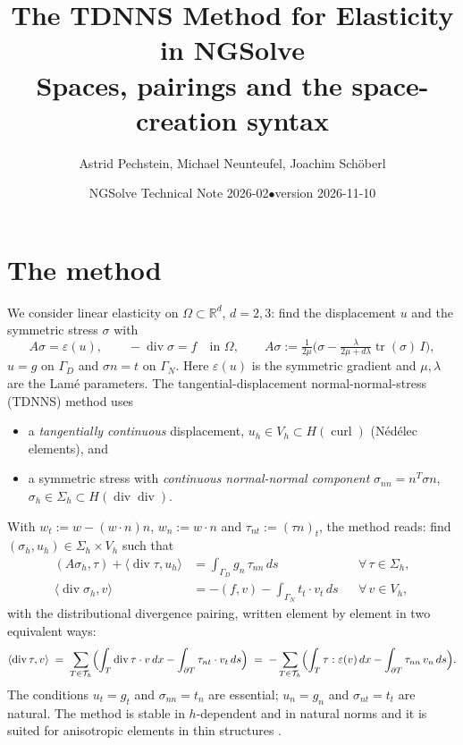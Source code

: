 \documentclass[10pt,a4paper]{article}
\title{\vspace{-1.2cm}The TDNNS Method for Elasticity in NGSolve\\[2pt]
\large Spaces, pairings and the space-creation syntax}
\author{Astrid Pechstein, Michael Neunteufel, Joachim Sch\"oberl}
\date{NGSolve Technical Note 2026-02\quad$\bullet$\quad version 2026-11-10}
\newcommand{\Th}{\mathcal{T}_h}
\newcommand{\Div}{\operatorname{div}}
\begin{document}
\maketitle\vspace{-1.2cm}

\section{The method}

We consider linear elasticity on $\Omega\subset\mathbb R^d$, $d=2,3$: find the displacement $u$ and the symmetric stress $\sigma$ with
\[
  A\sigma = \varepsilon(u), \qquad -\Div\sigma = f \quad\text{in }\Omega, \qquad
  A\sigma := \tfrac{1}{2\mu}\bigl(\sigma - \tfrac{\lambda}{2\mu+d\lambda}\operatorname{tr}(\sigma)\,I\bigr),
\]
$u=g$ on $\Gamma_D$ and $\sigma n = t$ on $\Gamma_N$. Here $\varepsilon(u)$ is the symmetric gradient and $\mu,\lambda$ are the Lam\'e parameters.
The tangential-displacement normal-normal-stress (TDNNS) method \cite{sinwel,ps11} uses
\begin{itemize}\setlength\itemsep{1pt}
\item a \emph{tangentially continuous} displacement, $u_h\in V_h\subset H(\operatorname{curl})$ (N\'ed\'elec elements), and
\item a symmetric stress with \emph{continuous normal-normal component} $\sigma_{nn}=n^T\sigma n$, $\sigma_h\in\Sigma_h\subset H(\Div\Div)$.
\end{itemize}
With $w_t := w-(w\cdot n)n$, $w_n:=w\cdot n$ and $\tau_{nt}:=(\tau n)_t$, the method reads: find $(\sigma_h,u_h)\in\Sigma_h\times V_h$ such that
\begin{align*}
  (A\sigma_h,\tau) + \langle\Div\tau,u_h\rangle &= \textstyle\int_{\Gamma_D} g_n\,\tau_{nn}\,ds && \forall\,\tau\in\Sigma_h,\\
  \langle\Div\sigma_h,v\rangle &= -(f,v) - \textstyle\int_{\Gamma_N} t_t\cdot v_t\,ds && \forall\,v\in V_h,
\end{align*}
with the distributional divergence pairing, written element by element in two equivalent ways:
\[
  \langle\Div\tau,v\rangle \;=\; \sum_{T\in\Th}\Bigl(\int_T \Div\tau\cdot v\,dx - \int_{\partial T}\tau_{nt}\cdot v_t\,ds\Bigr)
  \;=\; -\sum_{T\in\Th}\Bigl(\int_T \tau:\varepsilon(v)\,dx - \int_{\partial T}\tau_{nn}\,v_n\,ds\Bigr).
\]
The conditions $u_t=g_t$ and $\sigma_{nn}=t_n$ are essential; $u_n = g_n$ and $\sigma_{nt}=t_t$ are natural.
The method is stable in $h$-dependent and in natural norms \cite{ps11,ps18} and it is suited for anisotropic elements in thin structures \cite{ps12}.
\end{document}
